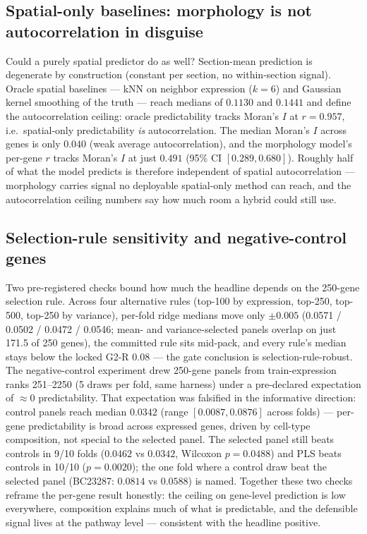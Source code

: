 \documentclass[11pt]{article}
\begin{document}
\subsection{Spatial-only baselines: morphology is not autocorrelation in disguise}
Could a purely spatial predictor do as well? Section-mean prediction is
degenerate by construction (constant per section, no within-section signal).
Oracle spatial baselines --- kNN on neighbor expression ($k=6$) and Gaussian
kernel smoothing of the truth --- reach medians of $0.1130$ and $0.1441$ and
define the autocorrelation ceiling: oracle predictability tracks Moran's $I$
at $r=0.957$, i.e.\ spatial-only predictability \emph{is} autocorrelation.
The median Moran's $I$ across genes is only $0.040$ (weak average
autocorrelation), and the morphology model's per-gene $r$ tracks Moran's $I$
at just $0.491$ (95\% CI $[0.289, 0.680]$). Roughly half of what the model
predicts is therefore independent of spatial autocorrelation --- morphology
carries signal no deployable spatial-only method can reach, and the autocorrelation
ceiling numbers say how much room a hybrid could still use.

\subsection{Selection-rule sensitivity and negative-control genes}
Two pre-registered checks bound how much the headline depends on the
250-gene selection rule. Across four alternative rules (top-100 by expression,
top-250, top-500, top-250 by variance), per-fold ridge medians move only
$\pm 0.005$ (0.0571 / 0.0502 / 0.0472 / 0.0546; mean- and variance-selected
panels overlap on just 171.5 of 250 genes), the committed rule sits mid-pack,
and every rule's median stays below the locked G2-R $0.08$ --- the gate
conclusion is selection-rule-robust. The negative-control experiment drew
250-gene panels from train-expression ranks 251--2250 (5 draws per fold, same
harness) under a pre-declared expectation of $\approx 0$ predictability. That
expectation was falsified in the informative direction: control panels reach
median $0.0342$ (range $[0.0087, 0.0876]$ across folds) --- per-gene
predictability is broad across expressed genes, driven by cell-type
composition, not special to the selected panel. The selected panel still beats
controls in 9/10 folds ($0.0462$ vs $0.0342$, Wilcoxon $p=0.0488$) and PLS
beats controls in 10/10 ($p=0.0020$); the one fold where a control draw beat
the selected panel (BC23287: $0.0814$ vs $0.0588$) is named. Together these
two checks reframe the per-gene result honestly: the ceiling on gene-level
prediction is low everywhere, composition explains much of what is
predictable, and the defensible signal lives at the pathway level ---
consistent with the headline positive.
\end{document}
